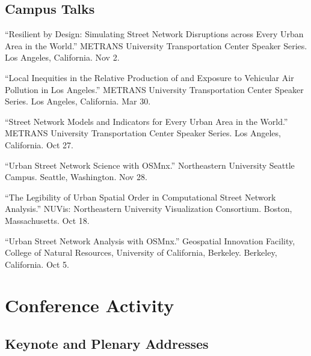 \documentclass[11pt,letterpaper]{report} %
\begin{document}
\subsection*{Campus Talks}

\begin{tablist}


\item[2023] \tab{}\enquote{Resilient by Design: Simulating Street Network Disruptions across Every Urban Area in the World.} METRANS University Transportation Center Speaker Series. Los Angeles, California. Nov 2.

\item[2022] \tab{}\enquote{Local Inequities in the Relative Production of and Exposure to Vehicular Air Pollution in Los Angeles.} METRANS University Transportation Center Speaker Series. Los Angeles, California. Mar 30.

\item[2020] \tab{}\enquote{Street Network Models and Indicators for Every Urban Area in the World.} METRANS University Transportation Center Speaker Series. Los Angeles, California. Oct 27.

\item[2018] \tab{}\enquote{Urban Street Network Science with OSMnx.} Northeastern University Seattle Campus. Seattle, Washington. Nov 28.

\item[2018] \tab{}\enquote{The Legibility of Urban Spatial Order in Computational Street Network Analysis.} NUVis: Northeastern University Visualization Consortium. Boston, Massachusetts. Oct 18.

\item[2017] \tab{}\enquote{Urban Street Network Analysis with OSMnx.} Geospatial Innovation Facility, College of Natural Resources, University of California, Berkeley. Berkeley, California. Oct 5.

\end{tablist}

\section*{Conference Activity}

\subsection*{Keynote and Plenary Addresses}
\end{document}
